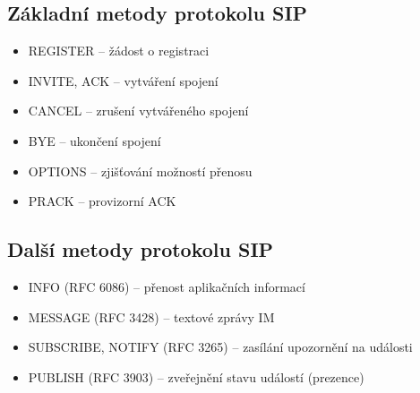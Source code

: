 \subsection{Základní metody protokolu SIP}
\begin{itemize}
    \item REGISTER -- žádost o registraci
    \item INVITE, ACK -- vytváření spojení
    \item CANCEL -- zrušení vytvářeného spojení
    \item BYE -- ukončení spojení
    \item OPTIONS -- zjišťování možností přenosu
    \item PRACK -- provizorní ACK
\end{itemize}

\subsection{Další metody protokolu SIP}
\begin{itemize}
    \item INFO (RFC 6086) – přenost aplikačních informací
    \item MESSAGE (RFC 3428) – textové zprávy IM
    \item SUBSCRIBE, NOTIFY (RFC 3265) – zasílání upozornění na události
    \item PUBLISH (RFC 3903) – zveřejnění stavu událostí (prezence)
\end{itemize}

